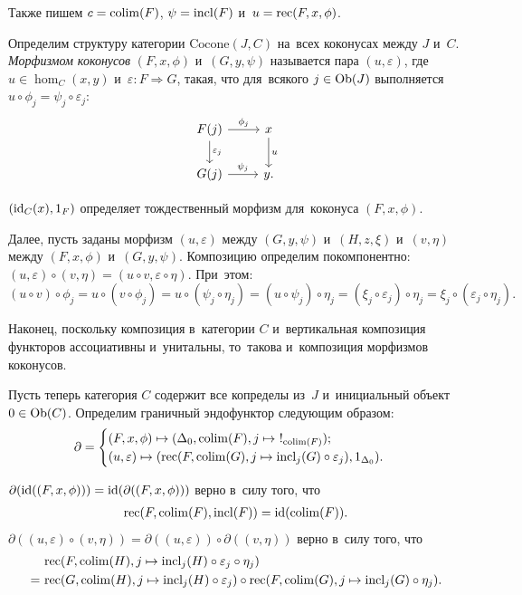 \documentclass[a4paper,oneside]{article}
\begin{document}
Также пишем $c = \mathrm{colim}(F)$, $\psi = \mathrm{incl}(F)$ и~$u = \mathrm{rec}(F, x, \phi)$.

Определим структуру категории $\mathrm{Cocone}(J, C)$ на~всех коконусах между $J$ и~$C$.
\textit{Морфизмом коконусов} $(F, x, \phi)$ и~$(G, y, \psi)$ называется пара $(u, \varepsilon)$,
где $u \in \hom_C(x, y)$ и~$\varepsilon : F \Rightarrow G$, такая, что для~всякого $j \in \mathrm{Ob}(J)$
выполняется $u \circ \phi_j = \psi_j \circ \varepsilon_j$:
\[
    \begin{tikzcd}
        \arrow{d}{\varepsilon_j} F(j) \arrow{r}{\phi_j} & \arrow{d}{u} x \\
                                 G(j) \arrow{r}{\psi_j} &              y.
    \end{tikzcd}
\]

$(\mathrm{id}_C(x), 1_F)$ определяет тождественный морфизм для~коконуса $(F, x, \phi)$.

Далее, пусть заданы морфизм $(u, \varepsilon)$ между $(G, y, \psi)$ и~$(H, z, \xi)$ и~$(v, \eta)$ между $(F, x, \phi)$ и~$(G, y, \psi)$.
Композицию определим покомпонентно: $(u, \varepsilon) \circ (v, \eta) = (u \circ v, \varepsilon \circ \eta)$.
При~этом:
$$
    (u \circ v) \circ \phi_j = u \circ (v \circ \phi_j)
                             = u \circ (\psi_j \circ \eta_j)
                             = (u \circ \psi_j) \circ \eta_j
                             = (\xi_j \circ \varepsilon_j) \circ \eta_j
                             = \xi_j \circ (\varepsilon_j \circ \eta_j).
$$

Наконец, поскольку композиция в~категории $C$ и~вертикальная композиция функторов ассоциативны
и~унитальны, то~такова и~композиция морфизмов коконусов.

Пусть теперь категория $C$ содержит все копределы из~$J$ и~инициальный объект $0 \in \mathrm{Ob}(C)$.
Определим граничный эндофунктор следующим образом:
$$
\partial = \begin{cases}
             (F, x, \phi) \mapsto (\Delta_0, \colim(F), j \mapsto\ !_{\colim(F)}); \\
             (u, \varepsilon) \mapsto (\rec(F, \colim(G), j \mapsto \incl_j(G) \circ \varepsilon_j), 1_{\Delta_0}).
           \end{cases}
$$

$\partial(\mathrm{id}((F, x, \phi))) = \mathrm{id}(\partial((F, x, \phi)))$ верно в~силу того, что
\begin{align*}
    \mathrm{rec}(F, \mathrm{colim}(F), \mathrm{incl}(F)) = \mathrm{id}(\mathrm{colim}(F)).
\end{align*}
$\partial((u, \varepsilon) \circ (v, \eta)) = \partial((u, \varepsilon)) \circ \partial((v, \eta))$
верно в~силу того, что
\begin{align*}
    \phantom{=}&\ \mathrm{rec}(F, \mathrm{colim}(H), j \mapsto \mathrm{incl}_j(H) \circ \varepsilon_j \circ \eta_j) \\
              =&\ \mathrm{rec}(G, \mathrm{colim}(H), j \mapsto \mathrm{incl}_j(H) \circ \varepsilon_j) \circ \mathrm{rec}(F, \mathrm{colim}(G), j \mapsto \mathrm{incl}_j(G) \circ \eta_j).
\end{align*}
\end{document}
